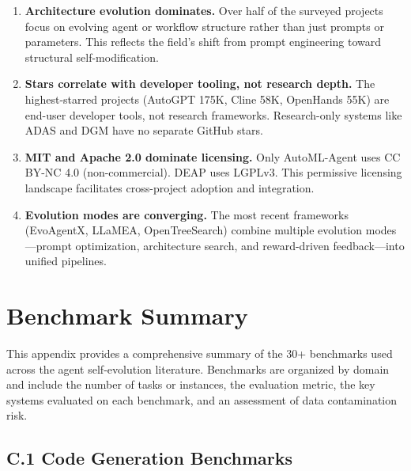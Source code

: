 \begin{enumerate}[nosep]
\item \textbf{Architecture evolution dominates.} Over half of the surveyed projects focus on evolving agent or workflow structure rather than just prompts or parameters. This reflects the field's shift from prompt engineering toward structural self-modification.

\item \textbf{Stars correlate with developer tooling, not research depth.} The highest-starred projects (AutoGPT 175K, Cline 58K, OpenHands 55K) are end-user developer tools, not research frameworks. Research-only systems like ADAS and DGM have no separate GitHub stars.

\item \textbf{MIT and Apache 2.0 dominate licensing.} Only AutoML-Agent uses CC BY-NC 4.0 (non-commercial). DEAP uses LGPLv3. This permissive licensing landscape facilitates cross-project adoption and integration.

\item \textbf{Evolution modes are converging.} The most recent frameworks (EvoAgentX, LLaMEA, OpenTreeSearch) combine multiple evolution modes---prompt optimization, architecture search, and reward-driven feedback---into unified pipelines.
\end{enumerate}


\newpage
\section{Benchmark Summary}
\label{app:benchmarks}

This appendix provides a comprehensive summary of the 30+ benchmarks used across the agent self-evolution literature. Benchmarks are organized by domain and include the number of tasks or instances, the evaluation metric, the key systems evaluated on each benchmark, and an assessment of data contamination risk.

\subsection*{C.1 Code Generation Benchmarks}

